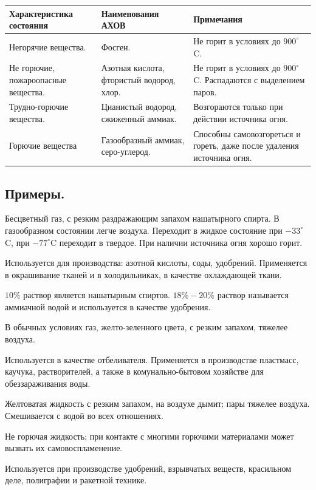 \documentclass[12pt]{article}
\begin{document}
\begin{itemize}
		\begin{xltabular}{\textwidth}{|X|X|X|}
			\hline
			\textbf{Характеристика состояния} & \textbf{Наименования АХОВ} & \textbf{Примечания}\\
			\hline
			Негорячие вещества. & Фосген. & Не горит в условиях до $900^{\circ}$C. \\
			\hline
			Не горючие, пожароопасные вещества. & Азотная кислота, фтористый водород, хлор. & Не горит в условиях до $900^{\circ}$C. Распадаются с выделением паров.\\
			\hline
			Трудно-горючие вещества. & Цианистый водород, сжиженный аммиак. & Возгораются только при действии источника огня.\\
			\hline
			Горючие вещества & Газообразный аммиак, серо-углерод. & Способны самовозгореться и гореть, даже после удаления источника огня.\\
			\hline
		\end{xltabular}
	\end{itemize}
	
	\subsection{Примеры.}
	
	\begin{definition}[Аммиак]
		Бесцветный газ, с резким раздражающим запахом нашатырного спирта. В газообразном состоянии легче воздуха. Переходит в жидкое состояние при $-33^{\circ}$C, при $-77^{\circ}$C переходит в твердое. При наличии источника огня хорошо горит.
		
		Используется для производства: азотной кислоты, соды, удобрений. Применяется в окрашивание тканей и в холодильниках, в качестве охлаждающей ткани.
		
		$10\%$ раствор является нашатырным спиртов. $18\%-20\%$ раствор называется аммиачной водой и используется в качестве удобрения.
	\end{definition}
	
	\begin{definition}[Хлор]
		В обычных условиях газ, желто-зеленного цвета, с резким запахом, тяжелее воздуха.
		
		Используется в качестве отбеливателя. Применяется в производстве пластмасс, каучука, растворителей, а также в комунально-бытовом хозяйстве для обеззараживания воды.
	\end{definition}
	
	\begin{definition}
		Желтоватая жидкость с резким запахом, на воздухе дымит; пары тяжелее воздуха. Смешивается с водой во всех отношениях.
		
		Не горючая жидкость; при контакте с многими горючими материалами может вызвать их самовоспламенение.
		
		Используется при производстве удобрений, взрывчатых веществ, красильном деле, полиграфии и ракетной технике.
	\end{definition}
	
\end{document}
